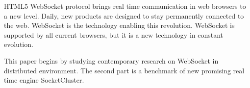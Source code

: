 HTML5 WebSocket protocol brings real time communication in web browsers to a 
new level. Daily, new products are designed to stay permanently connected to
the web. WebSocket is the technology enabling this revolution. WebSocket is 
supported by all current browsers, but it is a new technology in constant evolution.

This paper begins by studying contemporary research on WebSocket in distributed
environment. The second part is a benchmark of new promising real time engine 
SocketCluster.





